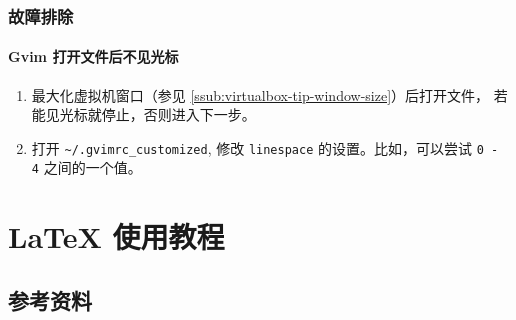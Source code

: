 \documentclass[cn,11pt, simple]{elegantbook}
\begin{document}
\subsection{故障排除}%
\label{sub:vim-troubleshooting}

\subsubsection{Gvim 打开文件后不见光标}%
\label{ssub:vim-ts-cursor}

\begin{enumerate}
    \item 最大化虚拟机窗口（参见
        \ref{ssub:virtualbox-tip-window-size}）后打开文件，
        若能见光标就停止，否则进入下一步。
    \item 打开 \lstinline{~/.gvimrc_customized}, 修改
        \lstinline{linespace} 的设置。比如，可以尝试  \lstinline{0 - 4}
        之间的一个值。
\end{enumerate}


%

\chapter{\LaTeX{} 使用教程}%
\label{cha:latex-tips}

\section{参考资料}%
\label{sec:latex-refs}
\end{document}
